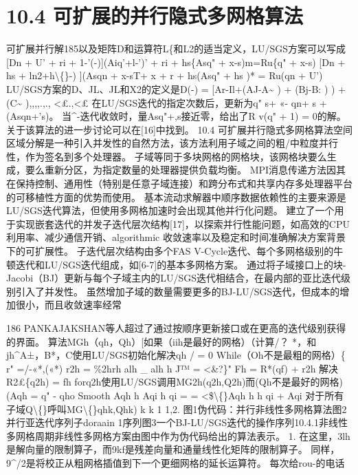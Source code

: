 \documentclass[UTF8,11pt,a4paper,openany,fontset=fandol]{ctexbook}
\begin{document}
\section{10.4 可扩展的并行隐式多网格算法}
可扩展并行解185以及矩阵D和运算符L\{和L2的适当定义，LU/SGS方案可以写成[Dn + U' + ri + 1-'(-)](Aiq'+l-')' + ri + hs\{Asq" + x-s)m=Ru\{q" + x-s) [Dn + hs + ln2+h\textbackslash\{\}-) ](Asqn + x-sT+ x + r + hs(Asq" + hs )* = Ru(qn + U') LU/SGS方案的D、JL、JL和X2的定义是D(-) = [Ar-Il+(AJ-A\textasciitilde{} ) + (Bj-B: ) ) +(C\textasciitilde{} ),,,,.,., <£.,<£ 在LU/SGS迭代的指定次数后，更新为q" s+ «- qn+ s + (Asqn+'s)。 当\textasciicircum{}-迭代收敛时，量Asq"+,s接近零，给出了R v(q" + 1) = 0的解。 关于该算法的进一步讨论可以在[16]中找到。 10.4 可扩展并行隐式多网格算法空间区域分解是一种引入并发性的自然方法，该方法利用子域之间的粗/中粒度并行性，作为签名到多个处理器。 子域等同于多块网格的网格块，该网格块要么生成，要么重新分区，为指定数量的处理器提供负载均衡。 MPI消息传递方法因其在保持控制、通用性（特别是任意子域连接）和跨分布式和共享内存多处理器平台的可移植性方面的优势而使用。 基本流动求解器中顺序数据依赖性的主要来源是LU/SGS迭代算法，但使用多网格加速时会出现其他并行化问题。 建立了一个用于实现嵌套迭代的并发子迭代层次结构[17]，以探索并行性能问题，如高效的CPU利用率、减少通信开销、algorithmic 收敛速率以及稳定和时间准确解决方案背景下的可扩展性。 子迭代层次结构由多个FAS V-Cycle迭代、每个多网格级别的牛顿迭代和LU/SGS迭代组成，如[6-7]的基本多网格方案。 通过将子域接口上的块-Jacobi（BJ）更新与每个子域主内的LU/SGS迭代相结合，在最内部的亚比迭代级别引入了并发性。 虽然增加子域的数量需要更多的BJ-LU/SGS迭代，但成本的增加很小，而且收敛速率经常

186 PANKAJAKSHAN等人超过了通过按顺序更新接口或在更高的迭代级别获得的界面。 算法MGh（qh，Qh）[如果（iih是最好的网格）（计算/？ *，和jh\textasciicircum{}A±，B*，C使用LU/SGS初始化解决qh / = 0 While（Oh不是最粗的网格）\{ r" =/-«*,(«*) r2h = \%2hrh alh \_ alh h J™ = <\&?\}" Fh = R*(qf) + r2h 解决R2£\{q2h) = fh forq2h使用LU/SGS调用MG2h(q2h,Q2h)而(Qh不是最好的网格) (Aqh = q" - qho Smooth Aqh h Aqi h qi = = <\$\textbackslash\{\}Aqh h h qi + Aqi 对于所有子域Q\textbackslash\{\}呼叫MG\textbackslash\{\}qhk,Qhk) k k 1 1,2. 图1伪代码：并行非线性多网格算法图2并行亚迭代序列子doraain 1序列图3一个BJ-LU/SGS迭代的操作序列10.4.1非线性多网格周期非线性多网格方案由图中作为伪代码给出的算法表示。 1. 在这里，3lh是解向量的限制算子，而9kf是残差向量和通量线性化矩阵的限制算子。 同样，9\textasciicircum{}/2是将校正从粗网格插值到下一个更细网格的延长运算符。 每次给rou-的电话
\end{document}
